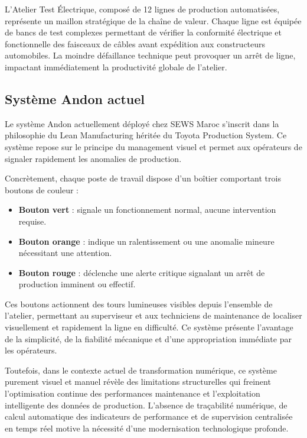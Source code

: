 L'Atelier Test Électrique, composé de 12 lignes de production automatisées, représente un maillon stratégique de la chaîne de valeur. Chaque ligne est équipée de bancs de test complexes permettant de vérifier la conformité électrique et fonctionnelle des faisceaux de câbles avant expédition aux constructeurs automobiles. La moindre défaillance technique peut provoquer un arrêt de ligne, impactant immédiatement la productivité globale de l'atelier.

\subsection{Système Andon actuel}

Le système Andon actuellement déployé chez SEWS Maroc s'inscrit dans la philosophie du Lean Manufacturing héritée du Toyota Production System. Ce système repose sur le principe du management visuel et permet aux opérateurs de signaler rapidement les anomalies de production.


Concrètement, chaque poste de travail dispose d'un boîtier comportant trois boutons de couleur :

\begin{itemize}
    \item \textbf{Bouton vert} : signale un fonctionnement normal, aucune intervention requise.
    \item \textbf{Bouton orange} : indique un ralentissement ou une anomalie mineure nécessitant une attention.
    \item \textbf{Bouton rouge} : déclenche une alerte critique signalant un arrêt de production imminent ou effectif.
\end{itemize}

Ces boutons actionnent des tours lumineuses visibles depuis l'ensemble de l'atelier, permettant au superviseur et aux techniciens de maintenance de localiser visuellement et rapidement la ligne en difficulté. Ce système présente l'avantage de la simplicité, de la fiabilité mécanique et d'une appropriation immédiate par les opérateurs.

Toutefois, dans le contexte actuel de transformation numérique, ce système purement visuel et manuel révèle des limitations structurelles qui freinent l'optimisation continue des performances maintenance et l'exploitation intelligente des données de production. L'absence de traçabilité numérique, de calcul automatique des indicateurs de performance et de supervision centralisée en temps réel motive la nécessité d'une modernisation technologique profonde.

